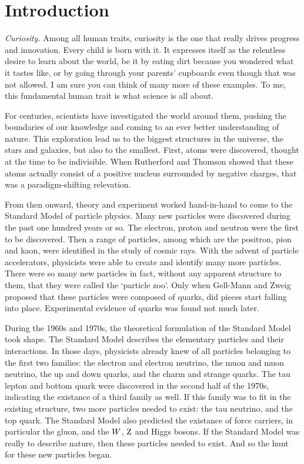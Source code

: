 \chapter{Introduction \label{chap:introduction}}

\textit{Curiosity.} Among all human traits, curiosity is the one that really drives progress and
innovation. Every child is born with it. It expresses itself as the relentless desire to learn about
the world, be it by eating dirt because you wondered what it tastes like, or by going through your
parents' cupboards even though that was not allowed. I am sure you can think of many more of these
examples. 
To me, this fundamental human trait is what science is all about. 

For centuries, scientists have investigated the world around them, pushing the boundaries of
our knowledge and coming to an ever better understanding of nature.
This exploration lead us to the biggest structures in the universe, the stars and galaxies, but
also to the smallest. First, atoms were discovered, thought at the time to be indivisible.
When Rutherford and Thomson showed that these atoms actually consist of a positive nucleus
surrounded by negative charges, that was a paradigm-shifting relevation. 

From then onward, theory and experiment worked hand-in-hand to come to the Standard Model of
particle physics. Many new particles were discovered during the past one hundred years or so. 
The electron, proton and neutron were the first to be discovered. Then a range of particles,
among which are the positron, pion and kaon, were identified in the study of cosmic rays. 
With the advent of particle accelerators, physicists were able to create and identify many more
particles. There were so many new particles in fact, without any apparent structure to them, that
they were called the `particle zoo'. Only when Gell-Mann and Zweig proposed that these particles
were composed of quarks, did pieces start falling into place. Experimental evidence of quarks was
found not much later. 

During the 1960s and 1970s, the theoretical formulation of the Standard Model took shape. 
The Standard Model describes the elementary particles and their interactions. In those days,
physicists already knew of all particles belonging to the first two families: the electron and
electron neutrino, the muon and muon neutrino, the up and down quarks, and the charm and strange
quarks. The tau lepton and bottom quark were discovered in the second half of the 1970s, indicating
the existance of a third family as well. If this family was to fit in the existing structure, two
more particles needed to exist: the tau neutrino, and the top quark. 
The Standard Model also predicted the existance of force carriers, in particular the gluon, and
the $W$, $\mathrm{Z}$ and Higgs bosons. 
If the Standard Model was really to describe nature, then these particles needed to exist. And so
the hunt for these new particles began.

